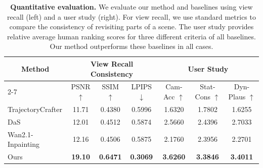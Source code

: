\begin{table}[t]
  \centering
  \small
  \caption{\textbf{Quantitative evaluation.} We evaluate our method and baselines using view recall (left) and a user study (right). For view recall, we use standard metrics to compare the consistency of revisiting parts of a scene. The user study provides relative average human ranking scores for three different criteria of all baselines. Our method outperforms these baselines in all cases.
  }
    \begin{tabular}{l|ccc|ccc}
    \toprule
    \multicolumn{1}{c|}{\multirow{2}[3]{*}{\textbf{Method}}} & \multicolumn{3}{c|}{View Recall Consistency} & \multicolumn{3}{c}{User Study} \\
\cmidrule{2-7}          & PSNR $\uparrow$ & SSIM $\uparrow$ & LPIPS $\downarrow$ & Cam-Acc $\uparrow$ & Stat-Cons $\uparrow$ & Dyn-Plaus $\uparrow$ \\
    \midrule
    TrajectoryCrafter & 11.71 & 0.4380 & 0.5996 &  1.6320     &  1.7802   &  1.6255 \\
    DaS   & 12.01 & 0.4512 & 0.5874 &  2.5660     &  2.4396     &  2.7033\\
    Wan2.1-Inpainting & 12.16 & 0.4506 & 0.5875 &  2.1760     & 2.3956      &  2.2701\\
    \midrule
    Ours  & \textbf{19.10} & \textbf{0.6471} & \textbf{0.3069} & \textbf{3.6260}   &  \textbf{3.3846}     & \textbf{3.4011} \\
    \bottomrule
    \end{tabular}%
  \label{tab:main_metrics}%
\end{table}%
